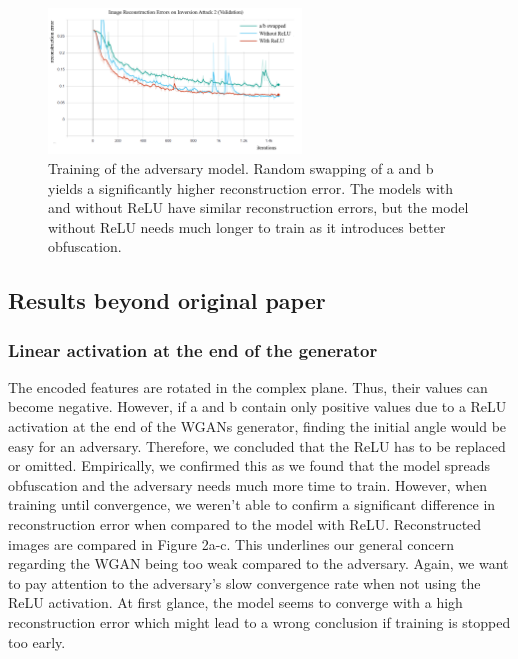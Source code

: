 \begin{figure}
    \centering
    \includegraphics[width=0.6\textwidth]{../openreview/images/diagram_training.png}
    \caption{Training of the adversary model. Random swapping of a and b yields a significantly higher reconstruction error. The models with and without ReLU have similar reconstruction errors, but the model without ReLU needs much longer to train as it introduces better obfuscation.}
    \label{fig:diagram_training}
\end{figure}

\subsection{Results beyond original paper}

\subsubsection{Linear activation at the end of the generator}
The encoded features are rotated in the complex plane. Thus, their values can become negative. However, if a and b contain only positive values due to a ReLU activation at the end of the WGANs generator, finding the initial angle would be easy for an adversary. Therefore, we concluded that the ReLU has to be replaced or omitted. Empirically, we confirmed this as we found that the model spreads obfuscation and the adversary needs much more time to train. However, when training until convergence, we weren't able to confirm a significant difference in reconstruction error when compared to the model with ReLU. Reconstructed images are compared in Figure 2a-c. This underlines our general concern regarding the WGAN being too weak compared to the adversary. Again, we want to pay attention to the adversary's slow convergence rate when not using the ReLU activation. At first glance, the model seems to converge with a high reconstruction error which might lead to a wrong conclusion if training is stopped too early.

